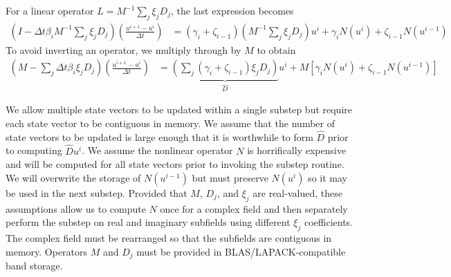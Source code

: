 \documentclass[letterpaper,reqno,11pt]{amsart}
\begin{document}
For a linear operator $L=M^{-1} \sum_{j} \xi_j D_{j}$, the last expression
becomes
\begin{align}
  \left(I-\Delta{}t\beta_{i}M^{-1}\sum_{j}\xi_{j}D_{j}\right)
  \left(\frac{u^{i+1} - u^{i}}{\Delta{}t}\right)
  &=
    \left(\gamma_i+\zeta_{i-1}\right)
      \left(M^{-1}\sum_{j}\xi_{j}D_{j}\right) u^i
  + \gamma_{i} N\left( u^{i} \right)
  + \zeta_{i-1} N\left( u^{i-1} \right)
\end{align}
To avoid inverting an operator, we multiply through by $M$ to obtain
\begin{align}
  \left(M-\sum_{j}\Delta{}t\beta_{i}\xi_{j}D_{j}\right)
  \left(\frac{u^{i+1} - u^{i}}{\Delta{}t}\right)
  &=
    \underbrace{
      \left(\sum_{j}\left(\gamma_i+\zeta_{i-1}\right)\xi_{j}D_{j}\right)
    }_{\hat{D}} u^i
  + M \left[
        \gamma_{i} N\left( u^{i} \right)
      + \zeta_{i-1} N\left( u^{i-1} \right)
    \right]
\end{align}

We allow multiple state vectors to be updated within a single substep but
require each state vector to be contiguous in memory.  We assume that the
number of state vectors to be updated is large enough that it is worthwhile to
form $\hat{D}$ prior to computing $\hat{D}u^{i}$.  We assume the nonlinear
operator $N$ is horrifically expensive and will be computed for all state
vectors prior to invoking the substep routine. We will overwrite the storage of
$N\left( u^{i-1} \right)$ but must preserve $N\left( u^i \right)$ so it may be
used in the next substep.  Provided that $M$, $D_j$, and $\xi_j$ are
real-valued, these assumptions allow us to compute $N$ once for a complex field
and then separately perform the substep on real and imaginary subfields using
different $\xi_j$ coefficients.  The complex field must be rearranged so that
the subfields are contiguous in memory.  Operators $M$ and $D_j$ must be
provided in BLAS/LAPACK-compatible band storage.
\end{document}
